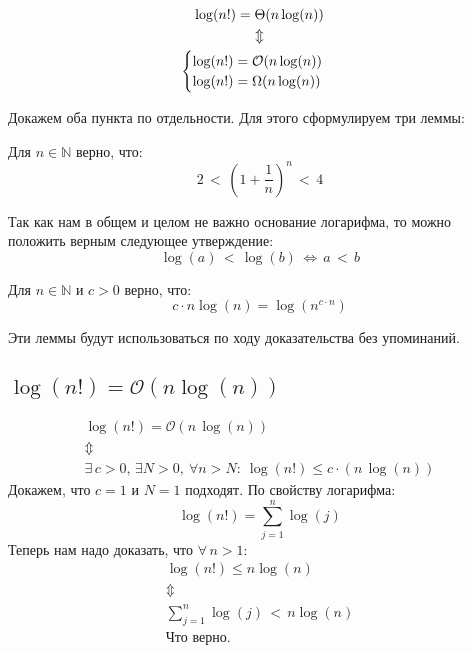 \section{}
\label{sec:3}
	\begin{gather*}
	\log(n!) = \Theta(n\log(n))
	\\
	\Updownarrow
	\\
	\begin{cases}
		$$\log(n!) = \mathcal{O}(n\log(n))$$
		\\
		$$\log(n!) = \Omega(n\log(n))$$
	\end{cases}
	\end{gather*}
	
	Докажем оба пункта по отдельности. Для этого сформулируем три леммы:
	\begin{lemma} \label{l1}
		Для $n \in \mathbb{N}$ верно, что:
		$$2 \, < \, \left(1+\frac{1}{n}\right)^n \, < \, 4$$
	\end{lemma}
	
	\begin{lemma} \label{l2}
		Так как нам в общем и целом не важно основание логарифма, то можно положить верным следующее утверждение:
		$$ \log(a) \, < \, \log(b) \, \Leftrightarrow \, a\,<\,b $$
	\end{lemma}

	\begin{lemma} \label{l3}
		Для $n \in \mathbb{N}$ и $c>0$ верно, что:
		$$ c\cdot n\log(n) = \log(n^{c\cdot n})$$
	\end{lemma}
		
		Эти леммы будут использоваться по ходу доказательства без упоминаний.
		
	\subsection{$\log(n!) = \mathcal{O}(n\log(n))$}
		\begin{gather*}
		\log(n!) = \mathcal{O}(n\,\log(n))
		\\
		\Updownarrow
		\\
		\exists \, c>0,\, \exists N>0,\: \forall n > N:\: \log(n!) \leq c\cdot(n\,\log(n))
		\end{gather*}
		Докажем, что $c=1$ и $N=1$ подходят. По свойству логарифма:
		$$ \log(n!) = \sum_{j=1}^{n} \log(j)$$
		Теперь нам надо доказать, что $\forall \, n > 1$:
		\begin{gather*}
		\log(n!) \leq n\log(n)
		\\
		\Updownarrow
		\\
		\sum_{j=1}^n \log(j) \, < \, n\log(n)
		\\
		\text{Что верно.}
		\end{gather*} 		
		
